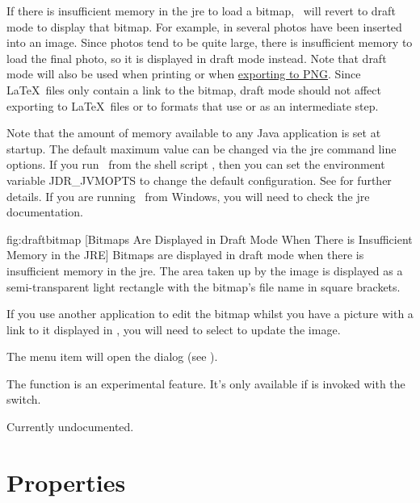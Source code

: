 If there is insufficient memory in the \gls{jre} to load a bitmap,
\FlowframTk\ will revert to draft mode to display that bitmap.  For
example, in  several photos have been
inserted into an image. Since photos tend to be quite large, there
is insufficient memory to load the final photo, so it is displayed
in draft mode instead. Note that draft mode will also be used when
printing or when \hyperref[sec:exportpng]{exporting to PNG}. Since \LaTeX\ files
only contain a link to the bitmap, draft mode should not affect
exporting to \LaTeX\ files or to formats that use  or
 as an intermediate step.

Note that the amount of memory available to any Java application is
set at startup. The default maximum value can be changed via the
\gls{jre} command line options.  If you run \FlowframTk\ from the
shell script , then you can set the environment
variable \gls{JDR_JVMOPTS} to change the default configuration. See
 for further details. If you are running
\FlowframTk\ from Windows, you will need to check the \gls*{jre}
documentation.

\FloatFig
  {fig:draftbitmap}
  {}
  [Bitmaps Are Displayed in Draft Mode When There is Insufficient Memory in the JRE]
  {Bitmaps are displayed in draft mode
when there is insufficient memory in the \gls{jre}. The area taken up by
the image is displayed as a semi-transparent light  rectangle
with the bitmap's file name in square brackets.}


If you use another application to edit the bitmap whilst
you have a picture with a link to it displayed in \FlowframTk, you will
need to select  to update the image.


The  menu item will open the 
 dialog (see ).


The  function is an experimental
feature. It's only available if  is invoked with
the  switch.

Currently undocumented.

\section{Properties}\label{sec:bitmapprops}

